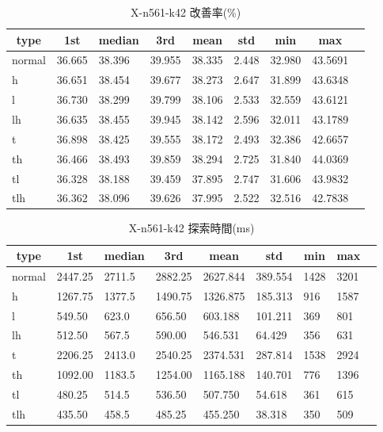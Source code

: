 \begin{table}[htbp]
    \caption{X-n561-k42 改善率(\%)}
    \begin{tabular}{|l|l|l|l|l|l|l|l|l|}\hline
    \multicolumn{1}{|c|}{\textbf{type}}
    &\multicolumn{1}{|c|}{\textbf{1st}}
    &\multicolumn{1}{c|}{\textbf{median}}
    &\multicolumn{1}{c|}{\textbf{3rd}}
    &\multicolumn{1}{c|}{\textbf{mean}}
    &\multicolumn{1}{c|}{\textbf{std}}
    &\multicolumn{1}{c|}{\textbf{min}}
    &\multicolumn{1}{c|}{\textbf{max}}\\\hline
	normal & 36.665 & 38.396 & 39.955 & 38.335 & 2.448 & 32.980 & 43.5691\\\hline
	h & 36.651 & 38.454 & 39.677 & 38.273 & 2.647 & 31.899 & 43.6348\\\hline
	l & 36.730 & 38.299 & 39.799 & 38.106 & 2.533 & 32.559 & 43.6121\\\hline
	lh & 36.635 & 38.455 & 39.945 & 38.142 & 2.596 & 32.011 & 43.1789\\\hline
	t & 36.898 & 38.425 & 39.555 & 38.172 & 2.493 & 32.386 & 42.6657\\\hline
	th & 36.466 & 38.493 & 39.859 & 38.294 & 2.725 & 31.840 & 44.0369\\\hline
	tl & 36.328 & 38.188 & 39.459 & 37.895 & 2.747 & 31.606 & 43.9832\\\hline
	tlh & 36.362 & 38.096 & 39.626 & 37.995 & 2.522 & 32.516 & 42.7838\\\hline
	\end{tabular}
\end{table}
\begin{table}[htbp]
    \caption{X-n561-k42 探索時間(ms)}
    \begin{tabular}{|l|l|l|l|l|l|l|l|l|}\hline
    \multicolumn{1}{|c|}{\textbf{type}}
    &\multicolumn{1}{|c|}{\textbf{1st}}
    &\multicolumn{1}{c|}{\textbf{median}}
    &\multicolumn{1}{c|}{\textbf{3rd}}
    &\multicolumn{1}{c|}{\textbf{mean}}
    &\multicolumn{1}{c|}{\textbf{std}}
    &\multicolumn{1}{c|}{\textbf{min}}
    &\multicolumn{1}{c|}{\textbf{max}}\\\hline
	normal & 2447.25 & 2711.5 & 2882.25 & 2627.844 & 389.554 & 1428 & 3201\\\hline
	h & 1267.75 & 1377.5 & 1490.75 & 1326.875 & 185.313 & 916 & 1587\\\hline
	l & 549.50 & 623.0 & 656.50 & 603.188 & 101.211 & 369 & 801\\\hline
	lh & 512.50 & 567.5 & 590.00 & 546.531 & 64.429 & 356 & 631\\\hline
	t & 2206.25 & 2413.0 & 2540.25 & 2374.531 & 287.814 & 1538 & 2924\\\hline
	th & 1092.00 & 1183.5 & 1254.00 & 1165.188 & 140.701 & 776 & 1396\\\hline
	tl & 480.25 & 514.5 & 536.50 & 507.750 & 54.618 & 361 & 615\\\hline
	tlh & 435.50 & 458.5 & 485.25 & 455.250 & 38.318 & 350 & 509\\\hline
	\end{tabular}
\end{table}
